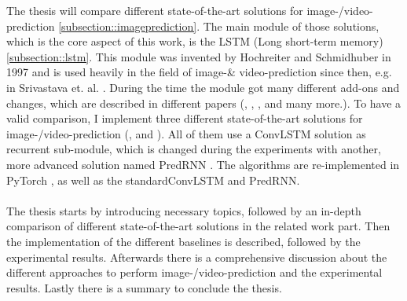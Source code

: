 The thesis will compare different state-of-the-art solutions for image-/video-prediction \ref{subsection::imageprediction}.
The main module of those solutions, which is the core aspect of this work, is the LSTM (Long short-term memory) \ref{subsection::lstm}.
This module was invented by Hochreiter and Schmidhuber  \cite{Hochreiter1997} in 1997 and is used heavily in the field of image-\& video-prediction since then, e.g. in Srivastava et. al. 
\cite{Srivastava2015}.
During the time the module got many different add-ons and changes, which are described in different papers (\cite{Patraucean2015}, \cite{Lotter2016}, \cite{Wang2017}, \cite{Wang2018} and many 
more.). To have a valid comparison, I implement three different state-of-the-art solutions for image-/video-prediction (\cite{Shi2015}, \cite{Patraucean2015} and \cite{Lotter2016}).
All of them use a ConvLSTM solution as recurrent sub-module, which is changed during the experiments
with another, more advanced solution named PredRNN \cite{Wang2017}. The algorithms are re-implemented in PyTorch \cite{Paszke2019}, as well as the \glqq standard\grqq ConvLSTM and PredRNN.\\\\
The thesis starts by introducing necessary topics, followed by an in-depth comparison of different state-of-the-art solutions in the related work part. Then the implementation of the different baselines is described, followed by the experimental results. Afterwards there is a comprehensive discussion about the different
approaches to perform image-/video-prediction and the experimental results. Lastly there is a summary to conclude the thesis.